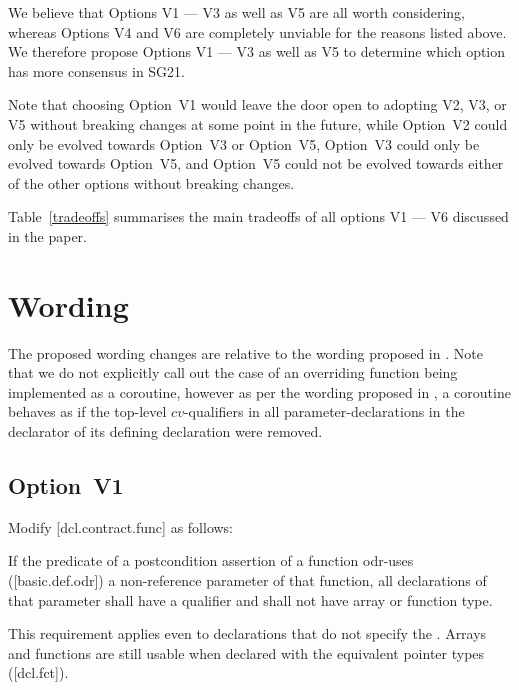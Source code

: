 We believe that Options V1 --- V3 as well as V5 are all worth considering, whereas Options V4 and V6 are completely unviable for the reasons listed above. We therefore propose Options V1 --- V3 as well as V5 to determine which option has more consensus in SG21. 

Note that choosing Option~V1 would leave the door open to adopting V2, V3, or V5 without breaking changes at some point in the future, while Option~V2 could only be evolved towards Option~V3 or Option~V5, Option~V3 could only be evolved towards Option~V5, and Option~V5 could not be evolved towards either of the other options without breaking changes.

Table~\ref{tradeoffs} summarises the main tradeoffs of all options V1 --- V6 discussed in the paper.

\section{Wording}

The proposed wording changes are relative to the wording proposed in \cite{P2900R10}. Note that we do not explicitly call out the case of an overriding function being implemented as a coroutine, however as per the wording proposed in \cite{P2900R10}, a coroutine behaves as if the top-level $cv$-qualifiers in all parameter-declarations in the declarator of its defining declaration were removed.

\subsection*{Option~V1}

Modify [dcl.contract.func] as follows:

\begin{adjustwidth}{0.5cm}{0.5cm}
If the predicate of a postcondition assertion of a function odr-uses ([basic.def.odr]) a
non-reference parameter of that function, all declarations of that parameter shall have a  qualifier and shall not have array or function type.
\begin{note}
This requirement applies even to declarations
that do not specify the . Arrays and functions are still usable when declared with the equivalent pointer types ([dcl.fct]).
\end{note}
\begin{example}
\tcode{[...]}
\end{example}
\end{adjustwidth}

